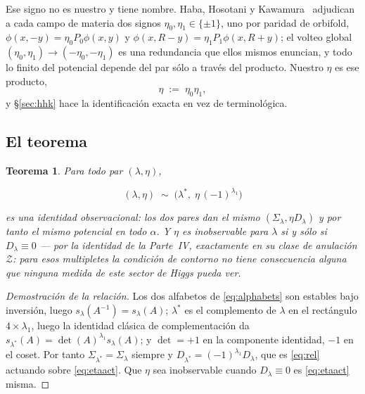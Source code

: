 \documentclass[11pt,a4paper]{article}
\newtheorem{theorem}{Teorema}
\newcommand{\Sig}{\Sigma_\lambda}
\newcommand{\Dl}{D_\lambda}
\newenvironment{keyeq}
  {\begin{center}\setlength{\fboxsep}{9pt}\setlength{\fboxrule}{0.8pt}%
   \begin{lrbox}{\keyeqbox}\begin{minipage}{0.88\textwidth}}
  {\end{minipage}\end{lrbox}%
   \fcolorbox{hdrblue!55}{hdrblue!6}{\usebox{\keyeqbox}}\end{center}}
\begin{document}
Ese signo no es nuestro y tiene nombre. Haba, Hosotani y Kawamura~\cite{HHK} adjudican a cada campo
de materia dos signos $\eta_0,\eta_1\in\{\pm1\}$, uno por paridad de orbifold,
$\phi(x,-y)=\eta_0P_0\phi(x,y)$ y $\phi(x,R-y)=\eta_1P_1\phi(x,R+y)$; el volteo global
$(\eta_0,\eta_1)\to(-\eta_0,-\eta_1)$ es una redundancia que ellos mismos enuncian, y todo lo finito
del potencial depende del par sólo a través del producto. Nuestro $\eta$ es ese producto,
\begin{equation}\label{eq:etaname}
\eta \;:=\; \eta_0\eta_1 ,
\end{equation}
y \S\ref{sec:hhk} hace la identificación exacta en vez de terminológica.

\subsection*{El teorema}

\begin{theorem}\label{thm:main}
Para todo par $(\lambda,\eta)$,
\begin{keyeq}
\begin{equation}\label{eq:rel}
(\lambda,\eta)\;\sim\;\big(\lambda^*,\;\eta\,(-1)^{\lambda_1}\big)
\end{equation}
\end{keyeq}
es una identidad observacional: los dos pares dan el mismo $(\Sig,\eta\Dl)$ y por tanto el mismo
potencial en todo $\alpha$. Y $\eta$ es inobservable para $\lambda$ \emph{si y sólo si}
$\Dl\equiv0$ --- por la identidad de la Parte~IV, exactamente en su clase de anulación
$\mathcal Z$: para esos multipletes la condición de contorno no tiene consecuencia alguna que
ninguna medida de este sector de Higgs pueda ver.
\end{theorem}

\begin{proof}[Demostración de la relación]
Los dos alfabetos de \eqref{eq:alphabets} son estables bajo inversión, luego
$s_\lambda(A^{-1})=s_\lambda(A)$; $\lambda^*$ es el complemento de $\lambda$ en el rectángulo
$4\times\lambda_1$, luego la identidad clásica de complementación da
$s_{\lambda^*}(A)=\det(A)^{\lambda_1}s_\lambda(A)$; y $\det=+1$ en la componente identidad, $-1$ en
el coset. Por tanto $\Sigma_{\lambda^*}=\Sig$ siempre y $D_{\lambda^*}=(-1)^{\lambda_1}\Dl$, que es
\eqref{eq:rel} actuando sobre \eqref{eq:etaact}. Que $\eta$ sea inobservable cuando $\Dl\equiv0$ es
\eqref{eq:etaact} misma.
\end{proof}
\end{document}
